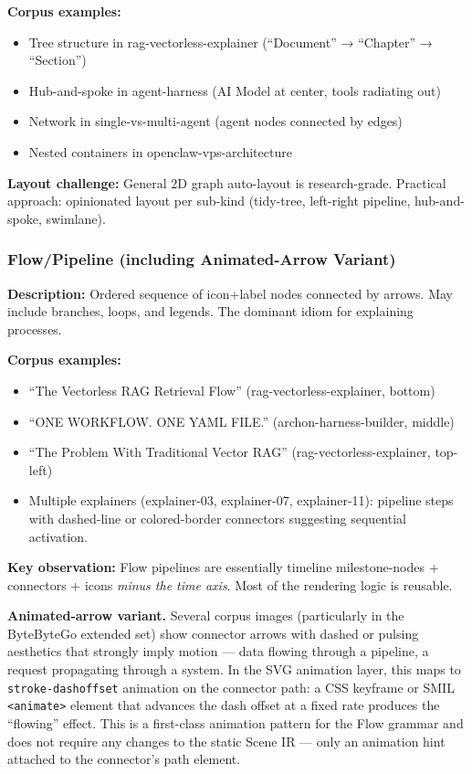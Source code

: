 \textbf{Corpus examples:}
\begin{itemize}
  \item Tree structure in rag-vectorless-explainer (``Document'' → ``Chapter'' → ``Section'')
  \item Hub-and-spoke in agent-harness (AI Model at center, tools radiating out)
  \item Network in single-vs-multi-agent (agent nodes connected by edges)
  \item Nested containers in openclaw-vps-architecture
\end{itemize}

\textbf{Layout challenge:} General 2D graph auto-layout is research-grade. Practical approach: opinionated layout per sub-kind (tidy-tree, left-right pipeline, hub-and-spoke, swimlane).

\subsubsection{Flow/Pipeline (including Animated-Arrow Variant)}

\textbf{Description:} Ordered sequence of icon+label nodes connected by arrows. May include branches, loops, and legends. The dominant idiom for explaining processes.

\textbf{Corpus examples:}
\begin{itemize}
  \item ``The Vectorless RAG Retrieval Flow'' (rag-vectorless-explainer, bottom)
  \item ``ONE WORKFLOW. ONE YAML FILE.'' (archon-harness-builder, middle)
  \item ``The Problem With Traditional Vector RAG'' (rag-vectorless-explainer, top-left)
  \item Multiple explainers (explainer-03, explainer-07, explainer-11): pipeline
        steps with dashed-line or colored-border connectors suggesting
        sequential activation.
\end{itemize}

\textbf{Key observation:} Flow pipelines are essentially timeline milestone-nodes + connectors + icons \emph{minus the time axis}. Most of the rendering logic is reusable.

\medskip\noindent
\textbf{Animated-arrow variant.}
Several corpus images (particularly in the ByteByteGo extended set) show
connector arrows with dashed or pulsing aesthetics that strongly imply
motion --- data flowing through a pipeline, a request propagating through
a system.  In the SVG animation layer, this maps to
\texttt{stroke-dashoffset} animation on the connector path:
a CSS keyframe or SMIL \texttt{<animate>} element that advances the dash
offset at a fixed rate produces the ``flowing'' effect.
This is a first-class animation pattern for the Flow grammar and does not
require any changes to the static Scene IR --- only an animation hint attached
to the connector's path element.

